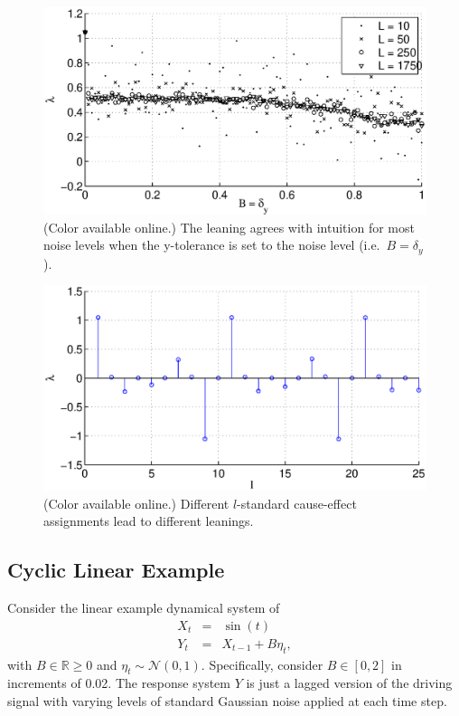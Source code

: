 \documentclass[a4paper,11pt,twocolumn]{article}
\begin{document}
\begin{figure}[ht]
\includegraphics[scale=0.5]{SimpleIRexample_Bxytol.eps}
\caption{(Color available online.) The leaning agrees with intuition for most noise levels when the y-tolerance is set to the noise level (i.e.\ $B=\delta_y$).}
\end{figure}
\begin{figure}[ht]
\includegraphics[scale=0.5]{SimpleIRexample_difflags.eps}
\caption{(Color available online.) Different $l$-standard cause-effect assignments lead to different leanings.}
\end{figure}

\subsection{Cyclic Linear Example}
Consider the linear example dynamical system of
\begin{eqnarray}
\label{eq:linearex}
X_t &=& \sin(t)\\
Y_t &=& X_{t-1}+B\eta_t,
\end{eqnarray}
with $B\in\mathbb{R}\ge 0$ and $\eta_t\sim\mathcal{N}\left(0,1\right)$.  Specifically, consider $B\in[0,2]$ in increments of 0.02.  The response system $Y$ is just a lagged version of the driving signal with varying levels of standard Gaussian noise applied at each time step.  
\end{document}
